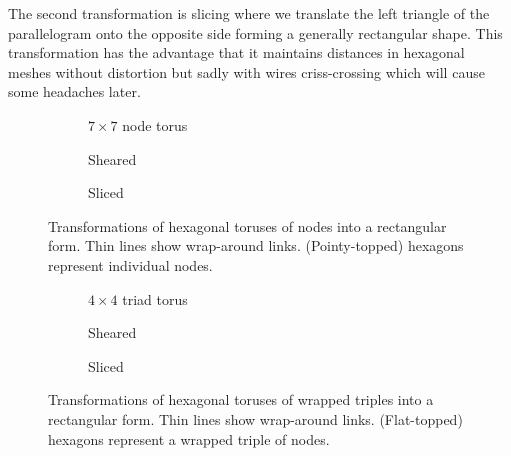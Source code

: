 			The second transformation is slicing where we translate the left triangle
			of the parallelogram onto the opposite side forming a generally
			rectangular shape. This transformation has the advantage that it
			maintains distances in hexagonal meshes without distortion but sadly with
			wires criss-crossing which will cause some headaches later.
			
			\begin{figure}
				\center
				\begin{subfigure}[b]{0.32\linewidth}
					\center
					
					\caption{$7 \times 7$ node torus}
					\label{fig:hex-to-plane-node-native}
				\end{subfigure}
				\begin{subfigure}[b]{0.32\linewidth}
					\center
					
					\caption{Sheared}
					\label{fig:hex-to-plane-node-shear}
				\end{subfigure}
				\begin{subfigure}[b]{0.32\linewidth}
					\center
					
					\caption{Sliced}
					\label{fig:hex-to-plane-node-slice}
				\end{subfigure}
				
				\caption{Transformations of hexagonal toruses of nodes into a
				rectangular form. Thin lines show wrap-around links. (Pointy-topped)
				hexagons represent individual nodes.}
				\label{fig:hexToPlaneNode}
			\end{figure}
			
			\begin{figure}
				
				\begin{subfigure}[b]{0.32\linewidth}
					\center
					
					\caption{$4 \times 4$ triad torus}
					\label{fig:hexToPlaneNative}
				\end{subfigure}
				\begin{subfigure}[b]{0.32\linewidth}
					\center
					
					\caption{Sheared}
					\label{fig:hexToPlaneShear}
				\end{subfigure}
				\begin{subfigure}[b]{0.32\linewidth}
					\center
					
					\caption{Sliced}
					\label{fig:hexToPlaneSlice}
				\end{subfigure}
				
				\caption{Transformations of hexagonal toruses of wrapped triples into a
				rectangular form.  Thin lines show wrap-around links. (Flat-topped)
				hexagons represent a wrapped triple of nodes.}
				\label{fig:hexToPlane}
			\end{figure}
			
